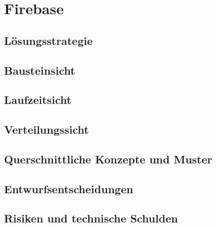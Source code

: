 \section{Firebase}

\subsection{Lösungsstrategie}

\subsection{Bausteinsicht}

\subsection{Laufzeitsicht}

\subsection{Verteilungssicht}

\subsection{Querschnittliche Konzepte und Muster}

\subsection{Entwurfsentscheidungen}

\subsection{Risiken und technische Schulden}